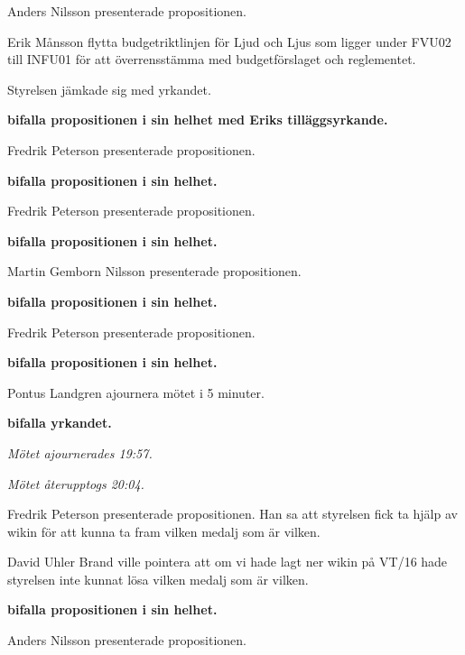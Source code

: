 \documentclass[10pt]{article}
\begin{document}
\begin{paragrafer}
\begin{paragrafer}
    \end{paragrafer}
    \begin{paragrafer}
        Anders Nilsson presenterade propositionen.

        Erik Månsson \ypa flytta budgetriktlinjen för Ljud och Ljus som ligger under FVU02 till INFU01 för att överrensstämma med budgetförslaget och reglementet.

        Styrelsen jämkade sig med yrkandet.

        \textbf{\Mba bifalla propositionen i sin helhet med Eriks tilläggsyrkande.}

        Fredrik Peterson presenterade propositionen.

        \textbf{\Mba bifalla propositionen i sin helhet.}

        Fredrik Peterson presenterade propositionen.

        \textbf{\Mba bifalla propositionen i sin helhet.}

        Martin Gemborn Nilsson presenterade propositionen.

        \textbf{\Mba bifalla propositionen i sin helhet.}

        Fredrik Peterson presenterade propositionen.

        \textbf{\Mba bifalla propositionen i sin helhet.}

        Pontus Landgren \ypa ajournera mötet i 5 minuter.

        \textbf{\Mba bifalla yrkandet.}

        \emph{Mötet ajournerades 19:57.}

        \emph{Mötet återupptogs 20:04.}

        Fredrik Peterson presenterade propositionen. Han sa att styrelsen fick ta hjälp av wikin för att kunna ta fram vilken medalj som är vilken.

        David Uhler Brand ville pointera att om vi hade lagt ner wikin på VT/16 hade styrelsen inte kunnat lösa vilken medalj som är vilken.

        \textbf{\Mba bifalla propositionen i sin helhet.}

        Anders Nilsson presenterade propositionen.


\end{paragrafer}
\end{paragrafer}
\end{document}
